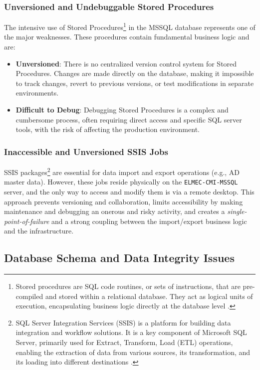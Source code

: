 \subsubsection{Unversioned and Undebuggable Stored Procedures}
The intensive use of Stored Procedures\footnote{Stored procedures are SQL code routines, or sets of instructions, that are pre-compiled and stored within a relational database. They act as logical units of execution, encapsulating business logic directly at the database level \cite{stored-procedures}.} in the MSSQL database represents one of the major weaknesses. These procedures contain fundamental business logic and are:
\begin{itemize}
    \item \textbf{Unversioned}: There is no centralized version control system for Stored Procedures. Changes are made directly on the database, making it impossible to track changes, revert to previous versions, or test modifications in separate environments.
    \item \textbf{Difficult to Debug}: Debugging Stored Procedures is a complex and cumbersome process, often requiring direct access and specific SQL server tools, with the risk of affecting the production environment.
\end{itemize}

\subsubsection{Inaccessible and Unversioned SSIS Jobs}
SSIS packages\footnote{SQL Server Integration Services (SSIS) is a platform for building data integration and workflow solutions. It is a key component of Microsoft SQL Server, primarily used for Extract, Transform, Load (ETL) operations, enabling the extraction of data from various sources, its transformation, and its loading into different destinations \cite{ssis}.} are essential for data import and export operations (e.g., AD master data). However, these jobs reside physically on the \texttt{ELMEC-CMI-MSSQL} server, and the only way to access and modify them is via a remote desktop. This approach prevents versioning and collaboration, limits accessibility by making maintenance and debugging an onerous and risky activity, and creates a \textit{single-point-of-failure} and a strong coupling between the import/export business logic and the infrastructure.

\subsection{Database Schema and Data Integrity Issues}

